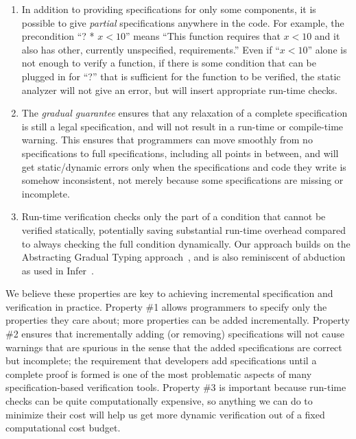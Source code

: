 \documentclass[10pt,twocolumn]{article}
\begin{document}
\begin{sloppypar}
\begin{enumerate}

\item
In addition to providing specifications for only some components, it is possible to give \textit{partial} specifications anywhere in the code.  For example, the precondition ``? * $x<10$'' means ``This function requires that $x<10$ and it also has other, currently unspecified, requirements.''  Even if ``$x<10$'' alone is not enough to verify a function, if there is some condition that can be plugged in for ``?'' that is sufficient for the function to be verified, the static analyzer will not give an error, but will insert appropriate run-time checks.

\item
The \textit{gradual guarantee} ensures that any relaxation of a complete specification is still a legal specification, and will not result in a run-time or compile-time warning.  This ensures that programmers can move smoothly from no specifications to full specifications, including all points in between, and will get static/dynamic errors only when the specifications and code they write is somehow inconsistent, not merely because some specifications are missing or incomplete.

\item
Run-time verification checks only the part of a condition that cannot be verified statically, potentially saving substantial run-time overhead compared to always checking the full condition dynamically.  Our approach builds on the Abstracting Gradual Typing approach~\cite{garcia2016abstracting}, and is also reminiscent of abduction as used in Infer~\cite{Calcagno:2011:CSA:2049697.2049700}.

\end{enumerate}

We believe these properties are key to achieving incremental specification and verification in practice.  Property \#1 allows programmers to specify only the properties they care about; more properties can be added incrementally.  Property \#2 ensures that incrementally adding (or removing) specifications will not cause warnings that are spurious in the sense that the added specifications are correct but incomplete; the requirement that developers add specifications until a complete proof is formed is one of the most problematic aspects of many specification-based verification tools.  Property \#3 is important because run-time checks can be quite computationally expensive, so anything we can do to minimize their cost will help us get more dynamic verification out of a fixed computational cost budget.



\end{sloppypar}
\end{document}
